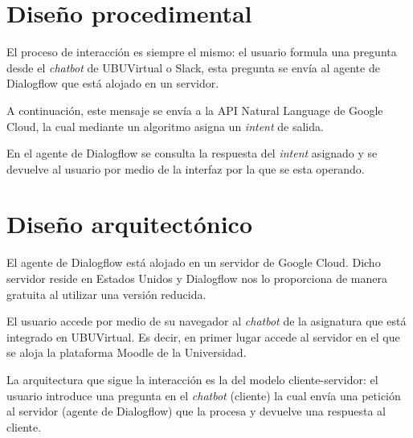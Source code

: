 

\section{Diseño procedimental}

El proceso de interacción es siempre el mismo: el usuario formula una pregunta desde el \textit{chatbot} de UBUVirtual o Slack, esta pregunta se envía al agente de Dialogflow que está alojado en un servidor. 

A continuación, este mensaje se envía a la API Natural Language de Google Cloud, la cual mediante un algoritmo asigna un \textit{intent} de salida.

En el agente de Dialogflow se consulta la respuesta del \textit{intent} asignado y se devuelve al usuario por medio de la interfaz por la que se esta operando.


\newpage

\section{Diseño arquitectónico}

El agente de Dialogflow está alojado en un servidor de Google Cloud. Dicho servidor reside en Estados Unidos y Dialogflow nos lo proporciona de manera gratuita al utilizar una versión reducida.

El usuario accede por medio de su navegador al \textit{chatbot} de la asignatura que está integrado en UBUVirtual. Es decir, en primer lugar accede al servidor en el que se aloja la plataforma Moodle de la Universidad. 

La arquitectura que sigue la interacción es la del modelo cliente-servidor: el usuario introduce una pregunta en el \textit{chatbot} (cliente) la cual envía una petición al servidor (agente de Dialogflow) que
 la procesa y devuelve una respuesta al cliente.



